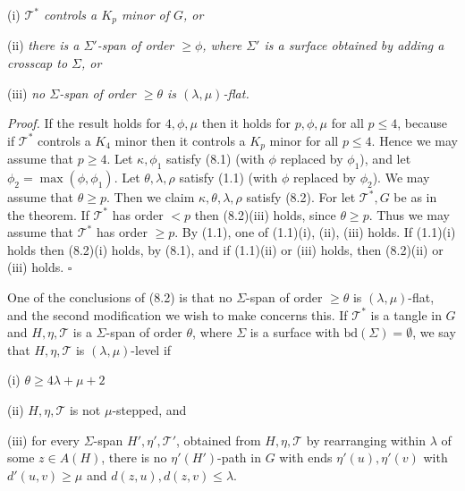 \hspace*{12pt}(i) \textit{$\mathcal{T}^*$ controls a $K_p$ minor of $G$, or}

\hspace*{12pt}(ii) \textit{there is a $\Sigma'$-span of order $\ge \phi$, where $\Sigma'$ is a surface obtained by adding a crosscap to $\Sigma$, or}

\hspace*{12pt}(iii) \textit{no $\Sigma$-span of order $\ge \theta$ is $(\lambda, \mu)$-flat.}

\textit{Proof.} If the result holds for $4, \phi, \mu$ then it holds for $p, \phi, \mu$ for all $p \le 4$, because if $\mathcal{T}^*$ controls a $K_4$ minor then it controls a $K_p$ minor for all $p \le 4$. Hence we may assume that $p \ge 4$. Let $\kappa, \phi_1$ satisfy (8.1) (with $\phi$ replaced by $\phi_1$), and let $\phi_2 = \max(\phi, \phi_1)$. Let $\theta, \lambda, \rho$ satisfy (1.1) (with $\phi$ replaced by $\phi_2$). We may assume that $\theta \ge p$. Then we claim $\kappa, \theta, \lambda, \rho$ satisfy (8.2). For let $\mathcal{T}^*, G$ be as in the theorem. If $\mathcal{T}^*$ has order $< p$ then (8.2)(iii) holds, since $\theta \ge p$. Thus we may assume that $\mathcal{T}^*$ has order $\ge p$. By (1.1), one of (1.1)(i), (ii), (iii) holds. If (1.1)(i) holds then (8.2)(i) holds, by (8.1), and if (1.1)(ii) or (iii) holds, then (8.2)(ii) or (iii) holds. $\square$

One of the conclusions of (8.2) is that no $\Sigma$-span of order $\ge \theta$ is $(\lambda, \mu)$-flat, and the second modification we wish to make concerns this. If $\mathcal{T}^*$ is a tangle in $G$ and $H, \eta, \mathcal{T}$ is a $\Sigma$-span of order $\theta$, where $\Sigma$ is a surface with $\text{bd}(\Sigma) = \emptyset$, we say that $H, \eta, \mathcal{T}$ is $(\lambda, \mu)$-level if

\hspace*{12pt}(i) $\theta \ge 4\lambda + \mu + 2$

\hspace*{12pt}(ii) $H, \eta, \mathcal{T}$ is not $\mu$-stepped, and

\hspace*{12pt}(iii) for every $\Sigma$-span $H', \eta', \mathcal{T}'$, obtained from $H, \eta, \mathcal{T}$ by rearranging within $\lambda$ of some $z \in A(H)$, there is no $\eta'(H')$-path in $G$ with ends $\eta'(u), \eta'(v)$ with $d'(u, v) \ge \mu$ and $d(z, u), d(z, v) \le \lambda$.

